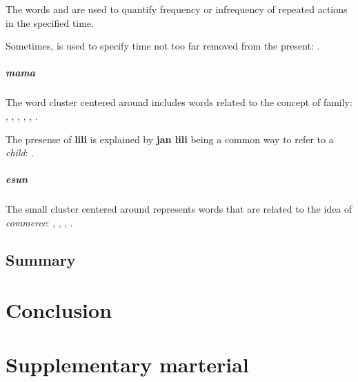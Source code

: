 \documentclass[14pt, a4paper]{extreport}
\begin{document}
The words  and  are used to quantify frequency or infrequency of repeated actions in the specified time.

Sometimes,  is used to specify time not too far removed from the present: .
      \paragraph{mama}
The word cluster centered around  includes words related to the concept of family: , , , , , .

The presense of \textbf{lili} is explained by \textbf{jan lili} being a common way to refer to a \textit{child}: .
      \paragraph{esun}
The small cluster centered around  represents words that are related to the idea of \textit{commerce}: , , , .

  \section{Summary}

\chapter{Conclusion}


\printbibliography[heading=bibintoc, title={References}, nottype=online]
\printbibliography[heading=bibintoc, title={Online resources}, type=online]

\chapter{Supplementary marterial}
\end{document}
